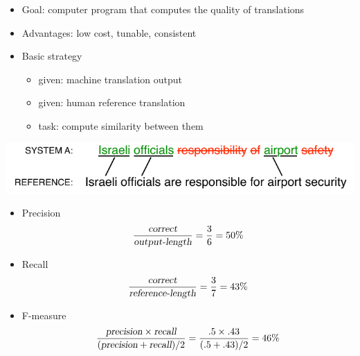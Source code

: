 \documentclass[landscape]{slides}
\newcommand{\maths}[1]{\textcolor{purple}{#1}}
\begin{document}

\vspace{20mm}
\begin{itemize}
\item Goal: computer program that computes the quality of translations
\item Advantages: low cost, tunable, consistent
\vspace{5mm}
\item Basic strategy
\begin{itemize}
\item given: machine translation output
\item given: human reference translation
\item task: compute similarity between them
\end{itemize}
\end{itemize}


\vspace{5mm}
\begin{center}
\includegraphics[scale=2]{word-error-rate1.pdf}
\end{center}
\begin{itemize}
\item Precision\vspace{-5mm}
\maths{\begin{equation*}
\frac{\text{\em correct}}{\text{\em output-length}} = \frac{3}{6} = 50\%
\end{equation*}}
\item Recall\vspace{-5mm}
\maths{\begin{equation*}
\frac{\text{\em correct}}{\text{\em reference-length}} = \frac{3}{7} = 43\%
\end{equation*}}
\item F-measure\vspace{-5mm}
\maths{\begin{equation*}
\frac{\text{\em precision} \times \text{\em recall}}{(\text{\em precision} + \text{\em recall})/2} = \frac{.5 \times .43}{(.5+.43)/2} = 46\%
\end{equation*}}
\end{itemize}
\end{document}
